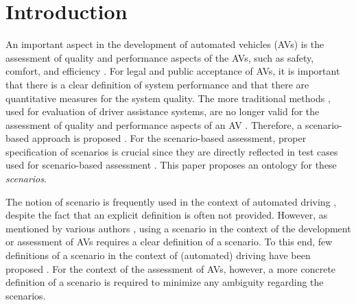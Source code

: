 \section{Introduction}
\label{sec:introduction}

An important aspect in the development of automated vehicles (AVs) is the assessment of quality and performance aspects of the AVs, such as safety, comfort, and efficiency \cite{bengler2014threedecades, stellet2015taxonomy, Helmer2017safety, putz2017pegasus, roesener2017comprehensive, gietelink2006development, roesener2016scenariobased, wachenfeld2016release}. 
For legal and public acceptance of AVs, it is important that there is a clear definition of system performance and that there are quantitative measures for the system quality. 
The more traditional methods \cite{response2006code, ISO26262}, used for evaluation of driver assistance systems, are no longer valid for the assessment of quality and performance aspects of an AV \cite{wachenfeld2016release}. 
Therefore, a scenario-based approach is proposed \cite{roesener2016scenariobased, putz2017pegasus}. 
For the scenario-based assessment, proper specification of scenarios is crucial since they are directly reflected in test cases used for scenario-based assessment \cite{stellet2015taxonomy}. 
This paper proposes an ontology for these \emph{scenarios}.

The notion of scenario is frequently used in the context of automated driving \cite{putz2017pegasus, roesener2017comprehensive, gietelink2006development, hulshof2013autonomous, karaduman2013interactivebehavior, englund2016grand, xu2002effects, ebner2011identifying, ploeg2017GCDC, zofka2015datadrivetrafficscenarios}, despite the fact that an explicit definition is often not provided. However, as mentioned by various authors \cite{stellet2015taxonomy, Helmer2017safety, alvarez2017prospective, zofka2015datadrivetrafficscenarios, aparicio2013pre, lesemann2011test, putz2017pegasus, geyer2014, ulbrich2015}, using a scenario in the context of the development or assessment of AVs requires a clear definition of a scenario. To this end, few definitions of a scenario in the context of (automated) driving have been proposed \cite{geyer2014, ulbrich2015, elrofai2016scenario}. For the context of the assessment of AVs, however, a more concrete definition of a scenario is required to minimize any ambiguity regarding the scenarios.

